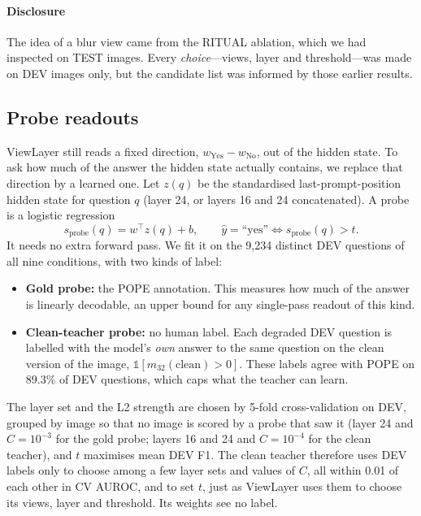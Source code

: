 \documentclass[10pt,a4paper]{article}
\newcommand{\ours}{ViewLayer}
\begin{document}
\paragraph{Disclosure} The idea of a blur view came from the RITUAL ablation, which we had inspected on TEST images. Every \emph{choice}---views, layer and threshold---was made on DEV images only, but the candidate list was informed by those earlier results.

\subsection{Probe readouts}\label{sec:probe}
\ours{} still reads a fixed direction, $w_{\text{Yes}}-w_{\text{No}}$, out of the hidden state. To ask how much of the answer the hidden state actually contains, we replace that direction by a learned one. Let $z(q)$ be the standardised last-prompt-position hidden state for question $q$ (layer 24, or layers 16 and 24 concatenated). A probe is a logistic regression
\begin{equation}
s_{\text{probe}}(q)=w^{\top}z(q)+b,\qquad \hat y=\text{``yes''}\iff s_{\text{probe}}(q)>t .
\label{eq:probe}
\end{equation}
It needs no extra forward pass. We fit it on the 9{,}234 distinct DEV questions of all nine conditions, with two kinds of label:
\begin{itemize}
\item \textbf{Gold probe:} the POPE annotation. This measures how much of the answer is linearly decodable, an upper bound for any single-pass readout of this kind.
\item \textbf{Clean-teacher probe:} no human label. Each degraded DEV question is labelled with the model's \emph{own} answer to the same question on the clean version of the image, $\mathbb{1}[m_{32}(\text{clean})>0]$. These labels agree with POPE on 89.3\% of DEV questions, which caps what the teacher can learn.
\end{itemize}
The layer set and the L2 strength are chosen by 5-fold cross-validation on DEV, grouped by image so that no image is scored by a probe that saw it (layer 24 and $C{=}10^{-3}$ for the gold probe; layers 16 and 24 and $C{=}10^{-4}$ for the clean teacher), and $t$ maximises mean DEV F1. The clean teacher therefore uses DEV labels only to choose among a few layer sets and values of $C$, all within 0.01 of each other in CV AUROC, and to set $t$, just as \ours{} uses them to choose its views, layer and threshold. Its weights see no label.
\end{document}
